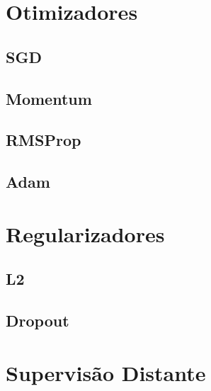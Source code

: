 \section{Otimizadores}

\subsection{SGD}

\subsection{Momentum}

\subsection{RMSProp}

\subsection{Adam}

\section{Regularizadores} \label{sec:regularizadores}

\subsection{L2}

\subsection{Dropout}

\section{Supervisão Distante}
